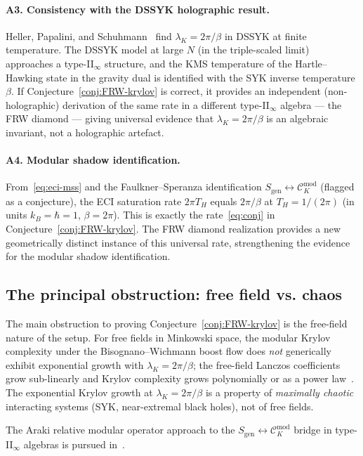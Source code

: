 \documentclass[12pt,a4paper]{article}
\theoremstyle{definition}
\newcommand{\lK}{\lambda_K}
\newcommand{\sgen}{S_{\mathrm{gen}}}
\newcommand{\Smod}{\mathcal{C}_K^{\mathrm{mod}}}
\begin{document}
\paragraph{A3. Consistency with the DSSYK holographic result.}
Heller, Papalini, and Schuhmann~\cite{HPS2024} find $\lK = 2\pi/\beta$
in DSSYK at finite temperature.
The DSSYK model at large $N$ (in the triple-scaled limit) approaches
a type-II$_\infty$ structure, and the KMS temperature of the Hartle--Hawking
state in the gravity dual is identified with the SYK inverse temperature $\beta$.
If Conjecture~\ref{conj:FRW-krylov} is correct, it provides an independent
(non-holographic) derivation of the same rate in a different type-II$_\infty$
algebra --- the FRW diamond --- giving universal evidence that
$\lK = 2\pi/\beta$ is an algebraic invariant, not a holographic artefact.

\paragraph{A4. Modular shadow identification.}
From~\eqref{eq:eci-mss} and the Faulkner--Speranza identification
$\sgen \leftrightarrow \Smod$ (flagged as a conjecture), the ECI
saturation rate $2\pi T_H$ equals $2\pi/\beta$ at $T_H = 1/(2\pi)$
(in units $k_B = \hbar = 1$, $\beta = 2\pi$).
This is exactly the rate~\eqref{eq:conj} in Conjecture~\ref{conj:FRW-krylov}.
The FRW diamond realization provides a new geometrically distinct instance
of this universal rate, strengthening the evidence for the modular shadow
identification.

\subsection{The principal obstruction: free field vs. chaos}

The main obstruction to proving Conjecture~\ref{conj:FRW-krylov} is the
free-field nature of the setup.
For free fields in Minkowski space, the modular Krylov complexity under
the Bisognano--Wichmann boost flow does \emph{not} generically exhibit
exponential growth with $\lK = 2\pi/\beta$; the free-field Lanczos
coefficients grow sub-linearly and Krylov complexity grows polynomially
or as a power law~\cite{Parker2019}.
The exponential Krylov growth at $\lK = 2\pi/\beta$ is a property
of \emph{maximally chaotic} interacting systems (SYK, near-extremal
black holes), not of free fields.

The Araki relative modular operator approach to the $\sgen \leftrightarrow \Smod$
bridge in type-II$_\infty$ algebras is pursued in~\cite{EREPR_Araki}.
\end{document}

